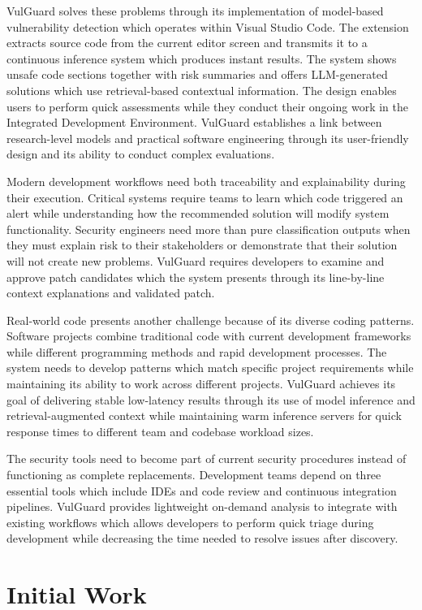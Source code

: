 VulGuard solves these problems through its implementation of model-based vulnerability detection which operates within Visual Studio Code. The extension extracts source code from the current editor screen and transmits it to a continuous inference system which produces instant results. The system shows unsafe code sections together with risk summaries and offers LLM-generated solutions which use retrieval-based contextual information. The design enables users to perform quick assessments while they conduct their ongoing work in the Integrated Development Environment. VulGuard establishes a link between research-level models and practical software engineering through its user-friendly design and its ability to conduct complex evaluations.

Modern development workflows need both traceability and explainability during their execution. Critical systems require teams to learn which code triggered an alert while understanding how the recommended solution will modify system functionality. Security engineers need more than pure classification outputs when they must explain risk to their stakeholders or demonstrate that their solution will not create new problems. VulGuard requires developers to examine and approve patch candidates which the system presents through its line-by-line context explanations and validated patch.

Real-world code presents another challenge because of its diverse coding patterns. Software projects combine traditional code with current development frameworks while different programming methods and rapid development processes. The system needs to develop patterns which match specific project requirements while maintaining its ability to work across different projects. VulGuard achieves its goal of delivering stable low-latency results through its use of model inference and retrieval-augmented context while maintaining warm inference servers for quick response times to different team and codebase workload sizes.

The security tools need to become part of current security procedures instead of functioning as complete replacements. Development teams depend on three essential tools which include IDEs and code review and continuous integration pipelines. VulGuard provides lightweight on-demand analysis to integrate with existing workflows which allows developers to perform quick triage during development while decreasing the time needed to resolve issues after discovery.

\chapter{Initial Work}
\label{ch:initial-work}

